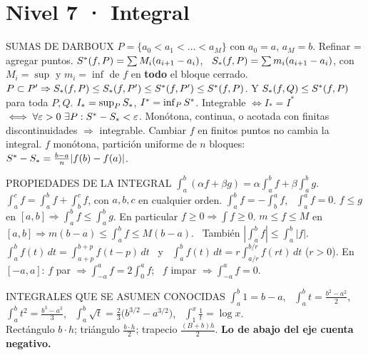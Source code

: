 \section*{Nivel 7 · Integral}
\begin{sello}{SUMAS DE DARBOUX}
 $P=\{a_0<a_1<\dots<a_M\}$ con $a_0=a$, $a_M=b$. Refinar = agregar puntos.
 $S^{*}(f,P)=\sum M_i(a_{i+1}-a_i)$, \ $S_{*}(f,P)=\sum m_i(a_{i+1}-a_i)$, con $M_i=\sup$ y $m_i=\inf$ de $f$ en \textbf{todo} el bloque cerrado.
 $P\subset P'\Rightarrow S_{*}(f,P)\le S_{*}(f,P')\le S^{*}(f,P')\le S^{*}(f,P)$. Y $S_{*}(f,Q)\le S^{*}(f,P)$ para toda $P,Q$.
 $I_*=\sup_PS_{*}$, $I^*=\inf_PS^{*}$. Integrable $\iff I_*=I^*$ $\iff\forall\varepsilon>0\ \exists P:S^{*}-S_{*}<\varepsilon$.
 Monótona, continua, o acotada con finitas discontinuidades $\Rightarrow$ integrable. Cambiar $f$ en finitos puntos no cambia la integral.
 $f$ monótona, partición uniforme de $n$ bloques: $S^{*}-S_{*}=\frac{b-a}n|f(b)-f(a)|$.
\end{sello}
\begin{sello}{PROPIEDADES DE LA INTEGRAL}
 $\int_a^b(\alpha f+\beta g)=\alpha\int_a^bf+\beta\int_a^bg$.
 $\int_a^cf=\int_a^bf+\int_b^cf$, con $a,b,c$ en cualquier orden.
 $\int_a^bf=-\int_b^af$, \ $\int_a^af=0$.
 $f\le g$ en $[a,b]\Rightarrow\int_a^bf\le\int_a^bg$. En particular $f\ge0\Rightarrow\int f\ge0$.
 $m\le f\le M$ en $[a,b]\Rightarrow m(b-a)\le\int_a^bf\le M(b-a)$. \ También $\left|\int_a^bf\right|\le\int_a^b|f|$.
 $\int_a^bf(t)\,dt=\int_{a+p}^{b+p}f(t-p)\,dt$ \ y \ $\int_a^bf(t)\,dt=r\int_{a/r}^{b/r}f(rt)\,dt$ ($r>0$).
 En $[-a,a]$: $f$ par $\Rightarrow\int_{-a}^af=2\int_0^af$; \ $f$ impar $\Rightarrow\int_{-a}^af=0$.
\end{sello}
\begin{memo}{INTEGRALES QUE SE ASUMEN CONOCIDAS}
 $\int_a^b1=b-a$, \ $\int_a^bt=\frac{b^2-a^2}2$, \ $\int_a^bt^2=\frac{b^3-a^3}3$, \ $\int_a^b\sqrt t=\frac23\big(b^{3/2}-a^{3/2}\big)$, \ $\int_1^x\frac1t=\log x$.\\
 Rectángulo $b\cdot h$; triángulo $\frac{b\cdot h}2$; trapecio $\frac{(B+b)h}2$. \textbf{Lo de abajo del eje cuenta negativo.}
\end{memo}

